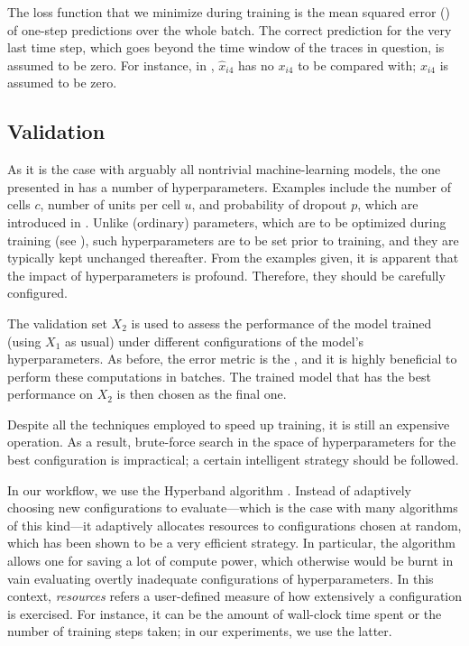 The loss function that we minimize during training is the mean squared error
() \cite{hastie2009} of one-step predictions over the whole batch. The
correct prediction for the very last time step, which goes beyond the time
window of the traces in question, is assumed to be zero. For instance, in
, $\hat{x}_{i4}$ has no $x_{i4}$ to be compared with; $x_{i4}$ is
assumed to be zero.

\subsection{Validation} 
As it is the case with arguably all nontrivial machine-learning models, the one
presented in  has a number of hyperparameters. Examples include the
number of cells $c$, number of units per cell $u$, and probability of dropout
$p$, which are introduced in . Unlike (ordinary) parameters,
which are to be optimized during training (see ), such
hyperparameters are to be set prior to training, and they are typically kept
unchanged thereafter. From the examples given, it is apparent that the impact of
hyperparameters is profound. Therefore, they should be carefully configured.

The validation set $X_2$ is used to assess the performance of the model trained
(using $X_1$ as usual) under different configurations of the model's
hyperparameters. As before, the error metric is the , and it is highly
beneficial to perform these computations in batches. The trained model that has
the best performance on $X_2$ is then chosen as the final one.

Despite all the techniques employed to speed up training, it is still an
expensive operation. As a result, brute-force search in the space of
hyperparameters for the best configuration is impractical; a certain intelligent
strategy should be followed.

In our workflow, we use the Hyperband algorithm \cite{li2016}. Instead of
adaptively choosing new configurations to evaluate---which is the case with many
algorithms of this kind---it adaptively allocates resources to configurations
chosen at random, which has been shown to be a very efficient strategy. In
particular, the algorithm allows one for saving a lot of compute power, which
otherwise would be burnt in vain evaluating overtly inadequate configurations of
hyperparameters. In this context, \emph{resources} refers a user-defined measure
of how extensively a configuration is exercised. For instance, it can be the
amount of wall-clock time spent or the number of training steps taken; in our
experiments, we use the latter.

